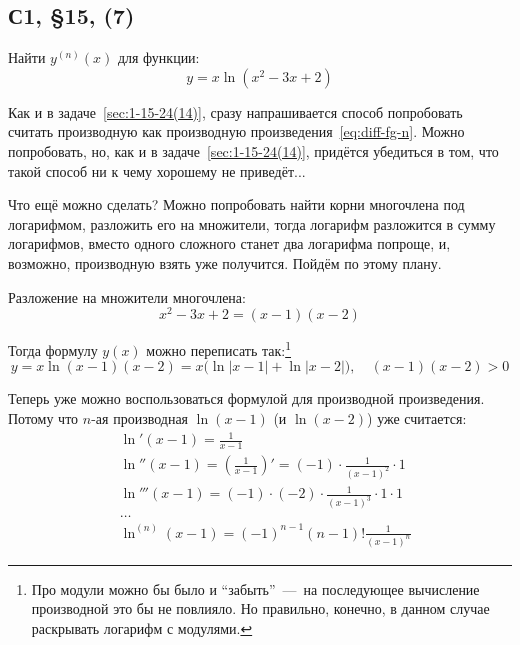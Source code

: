 \documentclass[a4paper,12pt]{article}
\begin{document}
  
  \subsection{С1, \S 15, (7)}

  Найти $y^{(n)}(x)$ для функции:
  \[
    y = x \ln{(x^2 - 3x + 2)}
  \]
  
  \begin{solution}
    Как и в задаче~\ref{sec:1-15-24(14)}, сразу напрашивается способ попробовать считать производную как производную произведения~\eqref{eq:diff-fg-n}.
    Можно попробовать, но, как и в задаче~\ref{sec:1-15-24(14)}, придётся убедиться в том, что такой способ ни к чему хорошему не приведёт...

    Что ещё можно сделать?
    Можно попробовать найти корни многочлена под логарифмом, разложить его на множители, тогда логарифм разложится в сумму логарифмов, вместо одного сложного станет два логарифма попроще, и, возможно, производную взять уже получится.
    Пойдём по этому плану.

    Разложение на множители многочлена:
    \[
      x^2 - 3x + 2 = (x - 1) (x - 2)
    \]

    Тогда формулу $y(x)$ можно переписать так:\footnote{
      Про модули можно бы было и ``забыть''~---~на последующее вычисление производной это бы не повлияло.
      Но правильно, конечно, в данном случае раскрывать логарифм с модулями.
    }
    \[
      y = x \ln{(x - 1)(x - 2)}
        = x \bigl(\ln{|x - 1|} + \ln{|x - 2|}\bigr),\quad (x - 1)(x - 2) > 0
    \]

    Теперь уже можно воспользоваться формулой для производной произведения.
    Потому что $n$-ая производная $\ln{(x - 1)}$ (и $\ln{(x - 2)}$) уже считается:
    \[
      \begin{aligned}
        &\ln'{(x - 1)} = \frac{1}{x - 1}\\
        &\ln''{(x - 1)} = \left(\frac{1}{x - 1}\right)' = (-1) \cdot \frac{1}{(x - 1)^2} \cdot 1\\
        &\ln'''{(x - 1)} = (-1) \cdot (-2) \cdot \frac{1}{(x - 1)^3} \cdot 1 \cdot 1\\
        &\ldots\\
        &\ln^{(n)}{(x - 1)} = (-1)^{n - 1} (n - 1)! \frac{1}{(x - 1)^n}
      \end{aligned}
    \]


\end{solution}
\end{document}

